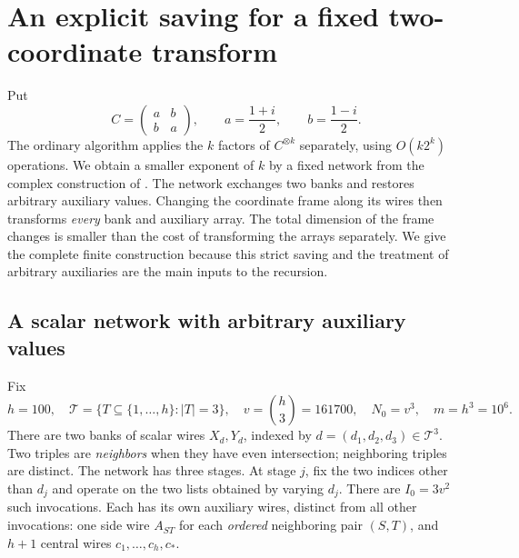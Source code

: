 \section{An explicit saving for a fixed two-coordinate transform}
\label{net:section}
\label{sec:network}

Put
\begin{equation}\label{net:C}
 C=\begin{pmatrix}a&b\\b&a\end{pmatrix},
 \qquad a=\frac{1+i}{2},\qquad b=\frac{1-i}{2}.
\end{equation}
The ordinary algorithm applies the $k$ factors of $C^{\otimes k}$
separately, using $O(k2^k)$ operations.  We obtain a smaller exponent
of $k$ by a fixed network from the complex construction of
\cite[Proposition~8 and Section~3.5]{motif}.  The network exchanges two banks and
restores arbitrary auxiliary values.  Changing the coordinate frame
along its wires then transforms \emph{every} bank and auxiliary array.
The total dimension of the frame changes is smaller than the cost of
transforming the arrays separately.  We give the complete finite
construction because this strict saving and the treatment of arbitrary
auxiliaries are the main inputs to the recursion.

\subsection{A scalar network with arbitrary auxiliary values}

Fix
\begin{equation}\label{net:parameters}
 h=100,\quad
 \mathcal T=\{T\subseteq\{1,\ldots,h\}:|T|=3\},\quad
 v=\binom h3=161700,\quad N_0=v^3,\quad m=h^3=10^6.
\end{equation}
There are two banks of scalar wires $X_d,Y_d$, indexed by
$d=(d_1,d_2,d_3)\in\mathcal T^3$.  Two triples are \emph{neighbors}
when they have even intersection; neighboring triples are distinct.
The network has three stages.  At stage $j$, fix the two indices other
than $d_j$ and operate on the two lists obtained by varying $d_j$.
There are $I_0=3v^2$ such invocations.  Each has its own auxiliary
wires, distinct from all other invocations: one side wire $A_{ST}$
for each \emph{ordered} neighboring pair $(S,T)$, and $h+1$ central
wires $c_1,\ldots,c_h,c_*$.

